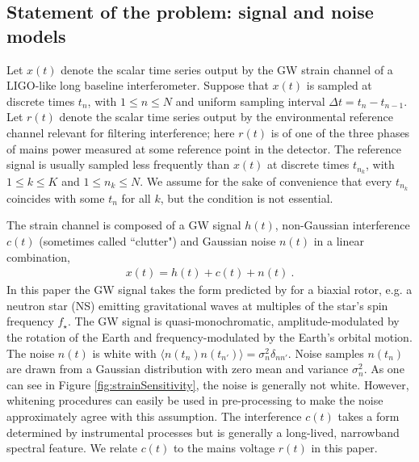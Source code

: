 \documentclass[pra,superscriptaddress,reprint,amsmath,amssymb,nofootinbib]{revtex4-2}
\begin{document}
\subsection{Statement of the problem: signal and noise models}  \label{sec21}
Let $x(t)$ denote the scalar time series output by the GW strain channel of a LIGO-like long baseline interferometer. Suppose that $x(t)$ is sampled at discrete times $t_n$, with $1 \leq n \leq N$ and uniform sampling interval $\Delta t = t_n - t_{n-1}$. Let $r(t)$ denote the scalar time series output by the environmental reference channel relevant for filtering interference; here $r(t)$ is of one of the three phases of mains power measured at some reference point in the detector. The reference signal is usually sampled less frequently than $x(t)$ at discrete times $t_{n_k}$, with $1 \leq k \leq K$ and $1 \leq n_k \leq N$. We assume for the sake of convenience that every $t_{n_k}$ coincides with some $t_n$ for all $k$, but the condition is not essential. \newline 

The strain channel is composed of a GW signal $h(t)$, non-Gaussian interference $c(t)$ (sometimes called ``clutter") and Gaussian noise $n(t)$ in a linear combination,
\begin{eqnarray}
	x(t) = h(t) + c(t) + n(t) \ .
	\label{eq:data}
\end{eqnarray}
 In this paper the GW signal takes the form predicted by \citet{Jaranowski1998} for a biaxial rotor, e.g. a neutron star (NS) emitting gravitational waves at multiples of the star's spin frequency $f_{\star}$. The GW signal is quasi-monochromatic, amplitude-modulated by the rotation of the Earth and frequency-modulated by the Earth's orbital motion. The noise $n(t)$ is white with $\langle n(t_n) n(t_{n'})\rangle = \sigma_n^2 \delta_{n n'}$. Noise samples $n(t_n)$ are drawn from a Gaussian distribution with zero mean and variance $\sigma_n^2$. As one can see in Figure \ref{fig:strainSensitivity}, the noise is generally not white. However, whitening procedures can easily be used in pre-processing to make the noise approximately agree with this assumption. The interference $c(t)$ takes a form determined by instrumental processes but is generally a long-lived, narrowband spectral feature. We relate $c(t)$ to the mains voltage $r(t)$ in this paper. \newline 
 
\end{document}
